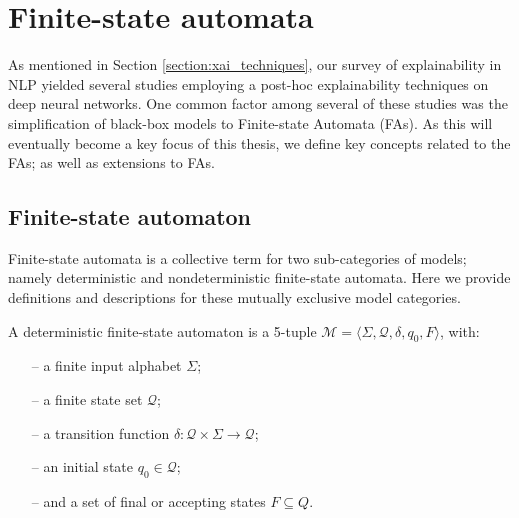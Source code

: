 \section{Finite-state automata}

\label{section:fa}

As mentioned in Section \ref{section:xai_techniques}, our survey of
explainability in NLP yielded several studies employing a post-hoc
explainability techniques on deep neural networks. One common factor among
several of these studies was the simplification of black-box models to
Finite-state Automata (FAs). As this will eventually become a key focus of this
thesis, we define key concepts related to the FAs; as well as extensions to FAs.

\subsection{Finite-state automaton}

Finite-state automata is a collective term for two sub-categories of models;
namely deterministic and nondeterministic finite-state automata. Here we provide
definitions and descriptions for these mutually exclusive model categories.

\begin{definition}
  \label{def:fa}
  A deterministic finite-state automaton is a 5-tuple $\mathcal{M} = \langle
  \Sigma, \mathcal{Q}, \delta, q_0, F \rangle$, with:
  \begin{itemize}
    \itemsep0em
    \item[--] a finite input alphabet $\Sigma$;
    \item[--] a finite state set $\mathcal{Q}$;
    \item[--] a transition function $\delta: \mathcal{Q} \times \Sigma
    \rightarrow \mathcal{Q}$;
    \item[--] an initial state $q_0 \in \mathcal{Q}$;
    \item[--] and a set of final or accepting states $F \subseteq Q$.
  \end{itemize}
\end{definition}

